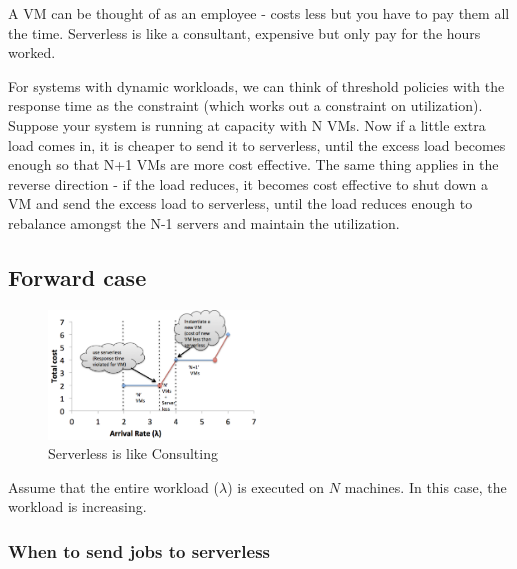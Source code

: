 \documentclass[letter,11pt]{article}
\begin{document}
A VM can be thought of as an employee - costs less but you have to pay them all the time. Serverless is like a consultant, expensive but only pay for the hours worked.

For systems with dynamic workloads, we can think of threshold policies with the response time as the constraint (which works out a constraint on utilization). Suppose your system is running at capacity with N VMs. Now if a little extra load comes in, it is cheaper to send it to serverless, until the excess load becomes enough so that N+1 VMs are more cost effective. The same thing applies in the reverse direction - if the load reduces, it becomes cost effective to shut down a VM and send the excess load to serverless, until the load reduces enough to rebalance amongst the N-1 servers and maintain the utilization.

\subsection{Forward case}

\begin{figure}[h]
    \centering
    \includegraphics[width=0.5\textwidth]{forward_consulting_model}
    \caption{Serverless is like Consulting}
    \label{fig:forward_model}
\end{figure}

 Assume that the entire workload ($\lambda$) is executed on $N$ machines. In this case, the workload is increasing.

\subsubsection{When to send jobs to serverless}
\end{document}
